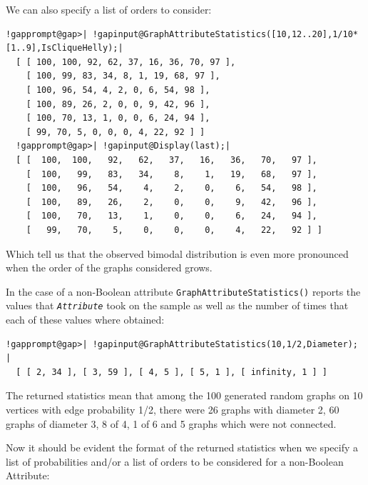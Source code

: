 \documentclass[a4paper,11pt]{report}
\begin{document}
{{{We can also specify a list of orders to consider: 

 
\begin{Verbatim}[commandchars=!@|,fontsize=\small,frame=single,label=Example]
  !gapprompt@gap>| !gapinput@GraphAttributeStatistics([10,12..20],1/10*[1..9],IsCliqueHelly);|
  [ [ 100, 100, 92, 62, 37, 16, 36, 70, 97 ], 
    [ 100, 99, 83, 34, 8, 1, 19, 68, 97 ], 
    [ 100, 96, 54, 4, 2, 0, 6, 54, 98 ], 
    [ 100, 89, 26, 2, 0, 0, 9, 42, 96 ], 
    [ 100, 70, 13, 1, 0, 0, 6, 24, 94 ], 
    [ 99, 70, 5, 0, 0, 0, 4, 22, 92 ] ]
  !gapprompt@gap>| !gapinput@Display(last);|
  [ [  100,  100,   92,   62,   37,   16,   36,   70,   97 ],
    [  100,   99,   83,   34,    8,    1,   19,   68,   97 ],
    [  100,   96,   54,    4,    2,    0,    6,   54,   98 ],
    [  100,   89,   26,    2,    0,    0,    9,   42,   96 ],
    [  100,   70,   13,    1,    0,    0,    6,   24,   94 ],
    [   99,   70,    5,    0,    0,    0,    4,   22,   92 ] ]
\end{Verbatim}
 

Which tell us that the observed bimodal distribution is even more pronounced
when the order of the graphs considered grows. 

In the case of a non-Boolean attribute \texttt{GraphAttributeStatistics()} reports the values that \mbox{\texttt{\mdseries\slshape Attribute}} took on the sample as well as the number of times that each of these values
where obtained: 

 
\begin{Verbatim}[commandchars=!@|,fontsize=\small,frame=single,label=Example]
  !gapprompt@gap>| !gapinput@GraphAttributeStatistics(10,1/2,Diameter);     |
  [ [ 2, 34 ], [ 3, 59 ], [ 4, 5 ], [ 5, 1 ], [ infinity, 1 ] ]
\end{Verbatim}
 

The returned statistics mean that among the 100 generated random graphs on 10
vertices with edge probability 1/2, there were 26 graphs with diameter 2, 60
graphs of diameter 3, 8 of 4, 1 of 6 and 5 graphs which were not connected. 

Now it should be evident the format of the returned statistics when we specify
a list of probabilities and/or a list of orders to be considered for a
non-Boolean Attribute: 

}}}
\end{document}
